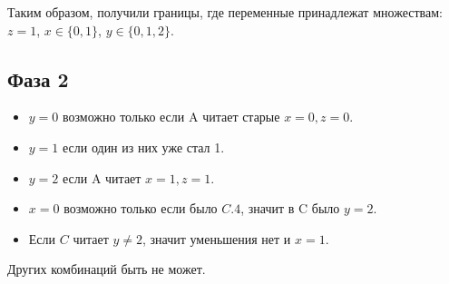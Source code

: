 \documentclass{article}
\begin{document}
Таким образом, получили границы, где переменные принадлежат множествам: $z=1$,
$x \in \{0,1\}$,
$y \in \{0,1,2\}$.

\subsection*{Фаза 2}

\begin{itemize}
\item $y=0$ возможно только если A читает старые $x=0,z=0$.
\item $y=1$ если один из них уже стал 1.
\item $y=2$ если A читает $x=1,z=1$.
\item $x=0$ возможно только если было $C.4$, значит в C было $y=2$.
\item Если $C$ читает $y\neq2$, значит уменьшения нет и $x=1$.
\end{itemize}

Других комбинаций быть не может.
\end{document}
